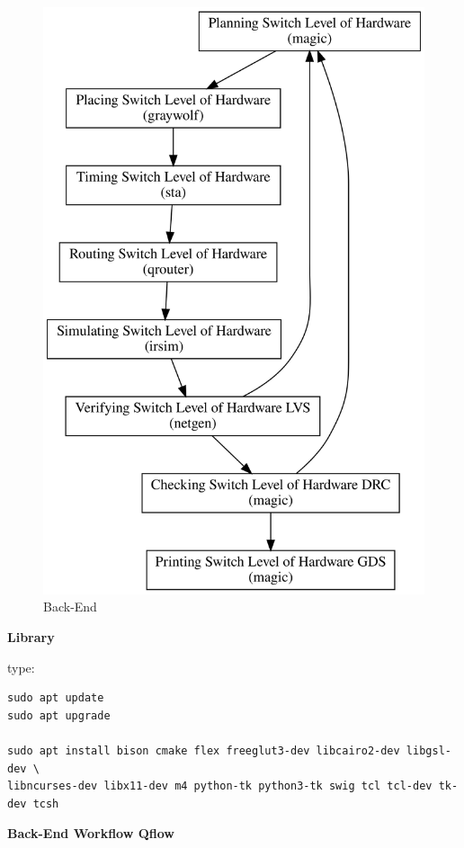 \documentclass[
]{article}
\begin{document}
\begin{figure}
\centering
\includegraphics{../doc/back-end.svg}
\caption{Back-End}
\end{figure}

\textbf{Library}

type:

\begin{verbatim}
sudo apt update
sudo apt upgrade

sudo apt install bison cmake flex freeglut3-dev libcairo2-dev libgsl-dev \
libncurses-dev libx11-dev m4 python-tk python3-tk swig tcl tcl-dev tk-dev tcsh
\end{verbatim}

\textbf{Back-End Workflow Qflow}
\end{document}
